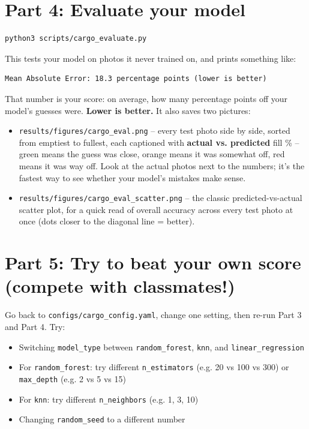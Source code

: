 \documentclass[11pt]{article}
\begin{document}
\section*{Part 4: Evaluate your model}
\begin{lstlisting}
python3 scripts/cargo_evaluate.py
\end{lstlisting}

This tests your model on photos it never trained on, and prints something
like:

\begin{lstlisting}
Mean Absolute Error: 18.3 percentage points (lower is better)
\end{lstlisting}

That number is your score: on average, how many percentage points off your
model's guesses were. \textbf{Lower is better.} It also saves two pictures:
\begin{itemize}
  \item \texttt{results/figures/cargo\_eval.png} -- every test photo side by
  side, sorted from emptiest to fullest, each captioned with \textbf{actual
  vs. predicted} fill \% -- green means the guess was close, orange means it
  was somewhat off, red means it was way off. Look at the actual photos next
  to the numbers; it's the fastest way to see whether your model's mistakes
  make sense.
  \item \texttt{results/figures/cargo\_eval\_scatter.png} -- the classic
  predicted-vs-actual scatter plot, for a quick read of overall accuracy
  across every test photo at once (dots closer to the diagonal line = better).
\end{itemize}

\section*{Part 5: Try to beat your own score (compete with classmates!)}
Go back to \texttt{configs/cargo\_config.yaml}, change one setting, then
re-run Part 3 and Part 4. Try:
\begin{itemize}
  \item Switching \texttt{model\_type} between \texttt{random\_forest}, \texttt{knn}, and \texttt{linear\_regression}
  \item For \texttt{random\_forest}: try different \texttt{n\_estimators} (e.g. 20 vs 100 vs 300) or \texttt{max\_depth} (e.g. 2 vs 5 vs 15)
  \item For \texttt{knn}: try different \texttt{n\_neighbors} (e.g. 1, 3, 10)
  \item Changing \texttt{random\_seed} to a different number
\end{itemize}
\end{document}
